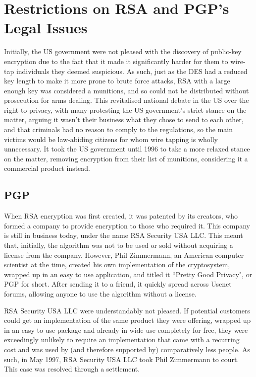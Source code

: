 \documentclass[a4paper,12pt]{report}
\begin{document}
  \section{Restrictions on RSA and PGP's Legal Issues}
Initially, the US government were not pleased with the discovery of public-key
encryption due to the fact that it made it significantly harder for them to
wire-tap individuals they deemed suspicious. As such, just as the DES had a
reduced key length to make it more prone to brute force attacks, RSA with a
large enough key was considered a munitions, and so could not be distributed
without prosecution for arms dealing. This revitalised national debate in the US
over the right to privacy, with many protesting the US government's strict
stance on the matter, arguing it wasn't their business what they chose to send
to each other, and that criminals had no reason to comply to the regulations, so
the main victims would be law-abiding citizens for whom wire tapping is wholly
unnecessary. It took the US government until 1996 to take a more relaxed stance
on the matter, removing encryption from their list of munitions, considering it
a commercial product instead\cite{clinton}.

    \subsection{PGP}
When RSA encryption was first created, it was patented by its creators, who
formed a company to provide encryption to those who required it. This company is
still in business today, under the name RSA Security USA LLC\cite{rsa}. This
meant that, initially, the algorithm was not to be used or sold without acquiring
a license from the company. However, Phil Zimmermann, an American computer
scientist at the time, created his own implementation of the cryptosystem,
wrapped up in an easy to use application, and titled it ``Pretty Good Privacy",
or PGP for short. After sending it to a friend, it quickly spread across Usenet
forums, allowing anyone to use the algorithm without a license\cite{zimmermann}.

RSA Security USA LLC were understandably not pleased. If potential customers
could get an implementation of the same product they were offering, wrapped up
in an easy to use package and already in wide use completely for free, they were
exceedingly unlikely to require an implementation that came with a recurring
cost and was used by (and therefore supported by) comparatively less people. As
such, in May 1997, RSA Security USA LLC took Phil Zimmermann to
court\cite{leaks}. This case was resolved through a settlement.
\end{document}
